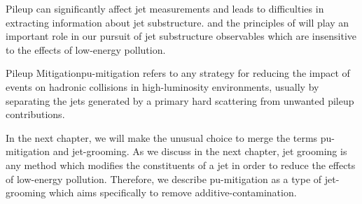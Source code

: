 \begin{subappendices}

Pileup can significantly affect jet measurements and leads to difficulties in extracting information about jet substructure.
%
 and the principles of  will play an important role in our pursuit of jet substructure observables which are insensitive to the effects of low-energy pollution.

\begin{definitionbox}{Pileup Mitigation}{pu-mitigation}
     refers to any strategy for reducing the impact of  events on hadronic collisions in high-luminosity environments, usually by separating the jets generated by a primary hard scattering from unwanted pileup contributions.
\end{definitionbox}

In the next chapter, we will make the unusual choice to merge the terms \gls{pu-mitigation} and \gls{jet-grooming}.
%
As we discuss in the next chapter, jet grooming is any method which modifies the constituents of a jet in order to reduce the effects of low-energy pollution.
%
Therefore, we describe \gls{pu-mitigation} as a type of \gls{jet-grooming} which aims specifically to remove \gls{additive-contamination}.


\end{subappendices}

